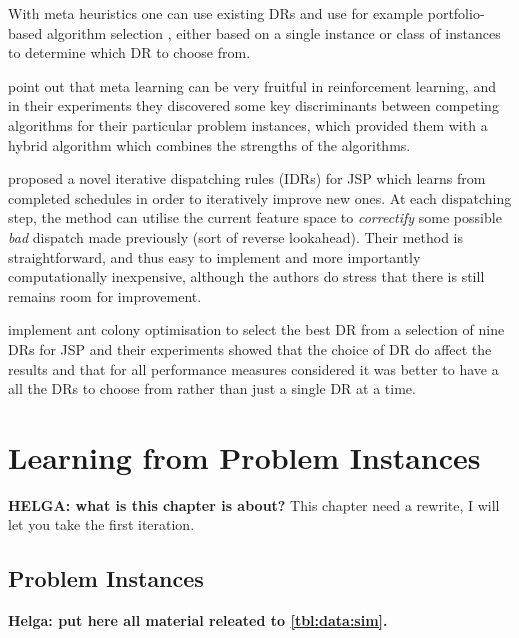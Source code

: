\documentclass[smallextended]{svjour3}
\begin{document}
With meta heuristics one can use existing DRs and use for example
portfolio-based algorithm selection \citep{Rice76,Gomes01}, either
based on a single instance or class of instances \citep{Xu07} to
determine which DR to choose from. 
	
\citet{Kalyanakrishnan11} point out that meta learning can be very
fruitful in reinforcement learning, and in their experiments they
discovered some key discriminants between competing algorithms for
their particular problem instances, which provided them with a hybrid
algorithm which combines the strengths of the algorithms.
	
\citet{Nguyen13} proposed a novel iterative dispatching rules (IDRs)
for JSP which learns from completed schedules in order to iteratively
improve new ones. At each dispatching step, the method can utilise the
current feature space to \emph{correctify} some possible \emph{bad}
dispatch made previously (sort of reverse lookahead).  Their method is
straightforward, and thus easy to implement and more importantly
computationally inexpensive, although the authors do stress that there
is still remains room for improvement.
	
\citet{Korytkowski13} implement ant colony optimisation to select the
best DR from a selection of nine DRs for JSP and their experiments
showed that the choice of DR do affect the results and that for all
performance measures considered it was better to have a all the DRs to
choose from rather than just a single DR at a time.
	

\section{Learning from Problem Instances}\label{sec:gentrainingdata}

{\bf HELGA: what is this  chapter is about?} This chapter need a rewrite, I will let you take the first iteration.

\subsection{Problem Instances}


{\bf Helga: put here all material releated to \cref{tbl:data:sim}. }
\end{document}
